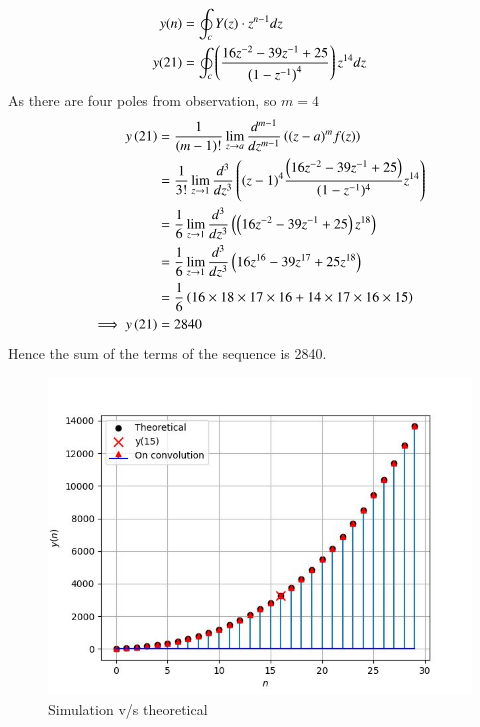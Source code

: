 \documentclass[journal,12pt,twocolumn]{IEEEtran}
\theoremstyle{remark}
\begin{document}
\begin{align}
    y(n)&=\oint_c Y(z)\cdot z^{n-1}dz\\
    y(21)&=\oint_c \brak{\frac{16z^{-2}-39z^{-1}+25}{\brak{1-z^{-1}}^4}} z^{14}dz
\end{align}
As there are four poles from observation, so $m=4$
\begin{align}
    y\brak{21} &= \frac{1}{(m-1)!} \lim_{z \to a} \frac{d^{m-1}}{dz^{m-1}}\brak{(z-a)^mf(z)}\\
    &= \frac{1}{3!} \lim_{z \to 1} \frac{d^{3}}{dz^{3}}\brak{(z-1)^4 \frac{\brak{16z^{-2}-39z^{-1}+25}}{(1-z^{-1})^4} z^{14}}\\
    &= \frac{1}{6} \lim_{z \to 1} \frac{d^{3}}{dz^{3}}\brak{\brak{16z^{-2}-39z^{-1}+25}z^{18}}\\
    &= \frac{1}{6} \lim_{z \to 1} \frac{d^{3}}{dz^{3}}\brak{16z^{16}-39z^{17}+25z^{18}}\\
    &= \frac{1}{6}  \brak{16 \times 18 \times 17 \times 16+14 \times 17 \times 16 \times 15 }\\
    \implies y\brak{21}&=2840 
\end{align}
Hence the sum of the terms of the sequence is 2840.

\begin{figure}[h]
    \centering  

\includegraphics[width=\columnwidth]{ncert-maths/11/9/4/5/fig/plot.png}

\begin{center}
    \caption{Simulation v/s theoretical}
\end{center}
    
    \label{fig:}
\end{figure}
\end{document}
